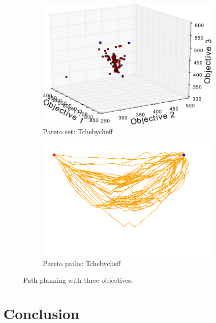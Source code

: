 \documentclass{article}
\begin{document}
\begin{figure}[h!]
\begin{subfigure}[b]{0.35\linewidth}
		\includegraphics[width=\textwidth]{fig/sim7-3obj/PF07-MORRT2.pdf}
		\caption{Pareto set: Tchebycheff}
		\label{fig:sim:many:pf:b}
	\end{subfigure} 
	\begin{subfigure}[b]{0.35\linewidth}
		\centering
		\includegraphics[width=\textwidth]{fig/sim7-3obj/MORRTstar02-ALL.png}
		\caption{Pareto paths: Tchebycheff}
		\label{fig:sim:many:sols:b}
	\end{subfigure}
	\caption{Path planning with three objectives.}
	\label{fig:sim:many}
\end{figure}

\section{Conclusion} 
\label{sec:conclusion}
\end{document}
